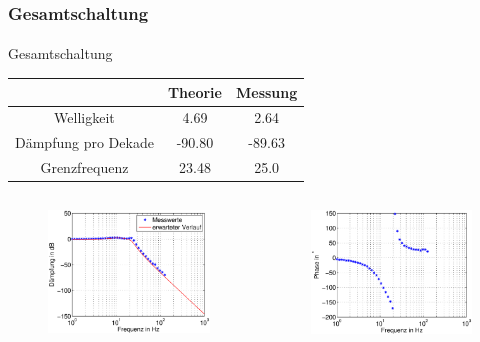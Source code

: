\begin{frame}
\frametitle{Gesamtschaltung}
\framesubtitle{}
    \begin{block}{Gesamtschaltung}
        \begin{tabular}{c|c|c}
        & Theorie & Messung \\ 
        \hline
        Welligkeit & 4.69& 2.64\\
        Dämpfung pro Dekade & -90.80& -89.63\\
        Grenzfrequenz &23.48 &25.0
        \end{tabular}
    \end{block}
\begin{columns}[c]
    \begin{figure}[H]
    \begin{center}
            \includegraphics[scale=0.3]{./img/plots/Auf_4_bode_ges_db.eps}
    \end{center}
    \end{figure}
    \begin{figure}[H]
    \begin{center}
            \includegraphics[scale=0.3]{./img/plots/Auf_4_bode_ges_ph.eps}
    \end{center}
    \end{figure}
\end{columns}
\end{frame}

